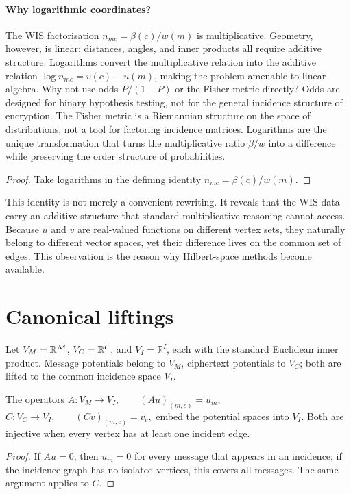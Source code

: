 \paragraph{Why logarithmic coordinates?}
The WIS factorisation $n_{mc}=\beta(c)/w(m)$ is multiplicative.  Geometry, however, is linear: distances, angles, and inner products all require additive structure.  Logarithms convert the multiplicative relation into the additive relation $\log n_{mc}=v(c)-u(m)$, making the problem amenable to linear algebra.  Why not use odds $P/(1-P)$ or the Fisher metric directly?  Odds are designed for binary hypothesis testing, not for the general incidence structure of encryption.  The Fisher metric is a Riemannian structure on the space of distributions, not a tool for factoring incidence matrices.  Logarithms are the unique transformation that turns the multiplicative ratio $\beta/w$ into a difference while preserving the order structure of probabilities.

\begin{proof}
Take logarithms in the defining identity $n_{mc}=\beta(c)/w(m)$.
\end{proof}

This identity is not merely a convenient rewriting.  It reveals that
the WIS data carry an additive structure that standard multiplicative
reasoning cannot access.  Because $u$ and $v$ are real-valued functions
on different vertex sets, they naturally belong to different vector
spaces, yet their difference lives on the common set of edges.  This
observation is the reason why Hilbert-space methods become available.
\section{Canonical liftings}\label{ch:sec:canonical-liftings}
Let $V_M=\mathbb R^{\mathcal{M}}$, $V_C=\mathbb R^{\mathcal{C}}$, and
$V_I=\mathbb R^I$, each with the standard Euclidean inner product.
Message potentials belong to $V_M$, ciphertext potentials to $V_C$;
both are lifted to the common incidence space $V_I$.
\begin{proposition}\label{ch:prop:canonical-lifting}
The operators
$A:V_M\to V_I,\qquad (Au)_{(m,c)}=u_m,$ $C:V_C\to V_I,\qquad (Cv)_{(m,c)}=v_c,$ embed the potential spaces into $V_I$.  Both are injective when every
vertex has at least one incident edge.
\end{proposition}
\begin{proof}
If $Au=0$, then $u_m=0$ for every message that appears in an
incidence; if the incidence graph has no isolated vertices, this
covers all messages.  The same argument applies to $C$.
\end{proof}


